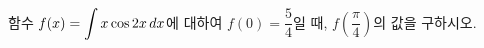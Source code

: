 \hspace*{2mm}\begin{minipage}[t]{\dimexpr\linewidth-2mm\relax}\vspace{0pt}
함수 $f(x)=\displaystyle\int x\cos 2x\mkern3mu dx$에 대하여 $f(0)=\dfrac{5}{4}$일 때, $f\!\left(\dfrac{\pi}{4}\right)$의 값을 구하시오.\end{minipage}
